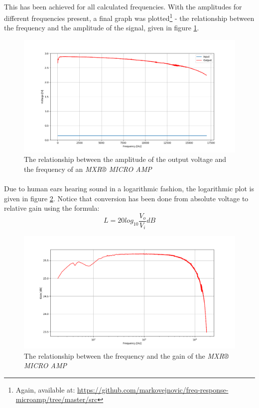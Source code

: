\documentclass[a4paper, 12pt]{article}
\begin{document}
\paragraph*{}
This has been achieved for all calculated frequencies. With the amplitudes 
for different frequencies present, a final graph was plotted\footnote{
Again, available at: 
\url{https://github.com/markovejnovic/freq-response-microamp/tree/master/src}}
- the relationship between the frequency and the amplitude of the signal, 
given in figure \ref{fig:freq-response-v-lin}.
\begin{figure}[ht]
	\centering
	\includegraphics[width=\textwidth]{img/freq-response-v-lin}
	\caption{The relationship between the amplitude of the output voltage and 
	the frequency of an \textit{MXR® MICRO AMP}}
	\label{fig:freq-response-v-lin}
\end{figure}

\paragraph*{}
Due to human ears hearing sound in a logarithmic fashion, the logarithmic plot 
is given in figure \ref{fig:freq-response-db-log}. Notice that conversion has 
been done from absolute voltage to relative gain using the formula:
$$L = 20log_{10}\frac{V_o}{V_i} \si{dB}$$
\begin{figure}[ht]
	\centering
	\includegraphics[width=\textwidth]{img/freq-response-db-log}
	\caption{The relationship between the frequency and the gain of the 
	\textit{MXR® MICRO AMP}}
	\label{fig:freq-response-db-log}
\end{figure}
\end{document}
